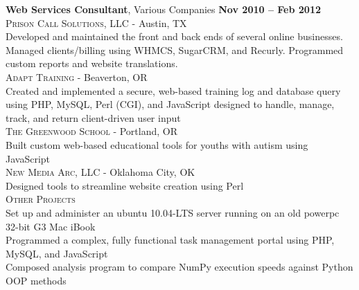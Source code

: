\documentclass[margin,line]{resume}
\begin{document}
\begin{resume}
\textbf{Web Services Consultant}, Various Companies \hfill \textbf{Nov 2010 -- Feb 2012}\vspace{2mm}\\
\textsc{Prison Call Solutions, LLC} - Austin, TX\vspace{1mm}\\%
Developed and maintained the front and back ends of several online businesses. Managed clients/billing using WHMCS, SugarCRM, and Recurly. Programmed custom reports and website translations.
\vspace{2mm}\\
\textsc{Adapt Training} - Beaverton, OR\vspace{1mm}\\%
Created and implemented a secure, web-based training log and database query using PHP, MySQL, Perl (CGI), and JavaScript designed to handle, manage, track, and return client-driven user input
\vspace{2mm}\\
\textsc{The Greenwood School} - Portland, OR\vspace{1mm}\\%
Built custom web-based educational tools for youths with autism using JavaScript
\vspace{2mm}\\
\textsc{New Media Arc, LLC} - Oklahoma City, OK\vspace{1mm}\\%
Designed tools to streamline website creation using Perl
\vspace{2mm}\\
\textsc{Other Projects}\vspace{1mm}\\
Set up and administer an ubuntu 10.04-LTS server running on an old powerpc 32-bit G3 Mac iBook\vspace{0.3mm}\\
Programmed a complex, fully functional task management portal using PHP, MySQL, and JavaScript\vspace{0.3mm}\\
Composed analysis program to compare NumPy execution speeds against Python OOP methods\vspace{0.3mm}\\



\end{resume}
\end{document}
